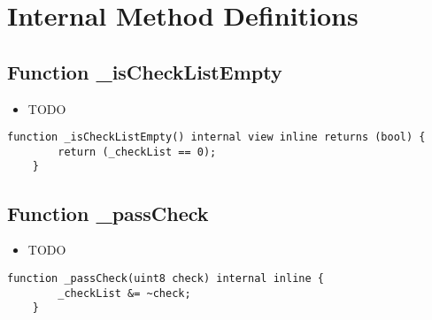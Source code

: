 \section{Internal Method Definitions}


\subsection{Function \_{}isCheckListEmpty}

\begin{itemize}
\item TODO
\end{itemize}

\begin{lstlisting}[firstnumber=9]
    function _isCheckListEmpty() internal view inline returns (bool) {
        return (_checkList == 0);
    }
\end{lstlisting}

\subsection{Function \_{}passCheck}

\begin{itemize}
\item TODO
\end{itemize}

\begin{lstlisting}[firstnumber=6]
    function _passCheck(uint8 check) internal inline {
        _checkList &= ~check;
    }
\end{lstlisting}
